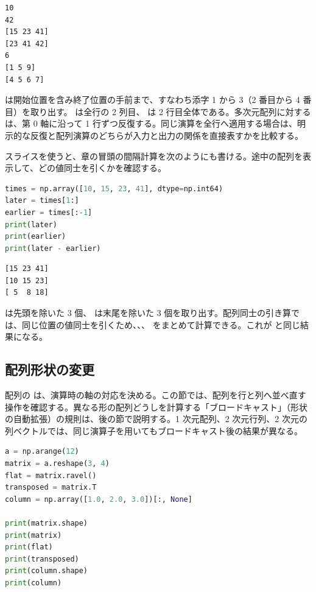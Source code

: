 \begin{lstlisting}[numbers=none, xleftmargin=2\zw]
10
42
[15 23 41]
[23 41 42]
6
[1 5 9]
[4 5 6 7]
\end{lstlisting}

 は開始位置を含み終了位置の手前まで、すなわち添字 1 から 3（2 番目から 4 番目）を取り出す。 は全行の 2 列目、 は 2 行目全体である。多次元配列に対する  は、第 0 軸に沿って 1 行ずつ反復する。同じ演算を全行へ適用する場合は、明示的な反復と配列演算のどちらが入力と出力の関係を直接表すかを比較する。

スライスを使うと、章の冒頭の間隔計算を次のようにも書ける。途中の配列を表示して、どの値同士を引くかを確認する。

\begin{lstlisting}[language=Python]
times = np.array([10, 15, 23, 41], dtype=np.int64)
later = times[1:]
earlier = times[:-1]
print(later)
print(earlier)
print(later - earlier)
\end{lstlisting}

\begin{lstlisting}[numbers=none, xleftmargin=2\zw]
[15 23 41]
[10 15 23]
[ 5  8 18]
\end{lstlisting}

 は先頭を除いた 3 個、 は末尾を除いた 3 個を取り出す。配列同士の引き算では、同じ位置の値同士を引くため、、、 をまとめて計算できる。これが  と同じ結果になる。

\subsection{配列形状の変更}

配列の  は、演算時の軸の対応を決める。この節では、配列を行と列へ並べ直す操作を確認する。異なる形の配列どうしを計算する「ブロードキャスト」（形状の自動拡張）の規則は、後の節で説明する。1 次元配列、2 次元行列、2 次元の列ベクトルでは、同じ演算子を用いてもブロードキャスト後の結果が異なる。

\begin{lstlisting}[language=Python]
a = np.arange(12)
matrix = a.reshape(3, 4)
flat = matrix.ravel()
transposed = matrix.T
column = np.array([1.0, 2.0, 3.0])[:, None]

print(matrix.shape)
print(matrix)
print(flat)
print(transposed)
print(column.shape)
print(column)
\end{lstlisting}

